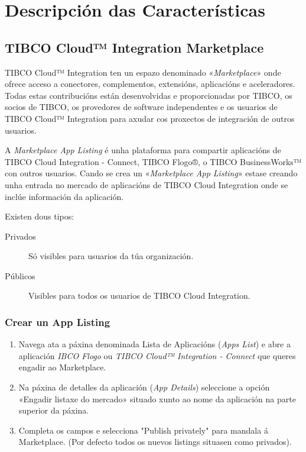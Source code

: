 \chapter{Descripción das Características}
\label{chap:DescripciónDasCaracteristicas}

\section{TIBCO Cloud™ Integration Marketplace}

TIBCO Cloud™ Integration ten un espazo denominado «\textit{Marketplace}» onde ofrece acceso a conectores, complementos, extensións, aplicacións e aceleradores. Todas estas contribucións están desenvolvidas e proporcionadas por TIBCO, os socios de TIBCO, os provedores de software independentes e os usuarios de TIBCO Cloud™ Integration para axudar cos proxectos de integración de outros usuarios.

A \textit{Marketplace App Listing} é unha plataforma para compartir aplicacións de TIBCO Cloud Integration - Connect, TIBCO Flogo®, o TIBCO BusinessWorks™ con outros usuarios. Cando se crea un «\textit{Marketplace App Listing}» estase creando unha entrada no mercado de aplicacións de TIBCO Cloud Integration onde se inclúe información da aplicación.

Existen dous tipos:

\begin{description}
    \item[Privados] Só visibles para usuarios da túa organización.
    \item[Públicos] Visibles para todos os usuarios de TIBCO Cloud Integration.
\end{description}

\subsection{Crear un App Listing}

\begin{enumerate}
	\item Navega ata a páxina denominada Lista de Aplicacións (\textit{Apps List}) e abre a aplicación  \textit{IBCO Flogo} ou \textit{TIBCO Cloud™ Integration - Connect} que queres engadir ao Marketplace.
	
	\item Na páxina de detalles da aplicación (\textit{App Details}) seleccione a opción «Engadir listaxe do mercado» situado xunto ao nome da aplicación na parte superior da páxina.
	
	\item Completa os campos e selecciona "Publish privately" para mandala á Marketplace. (Por defecto todos os nuevos listings situasen como privados).
\end{enumerate}


